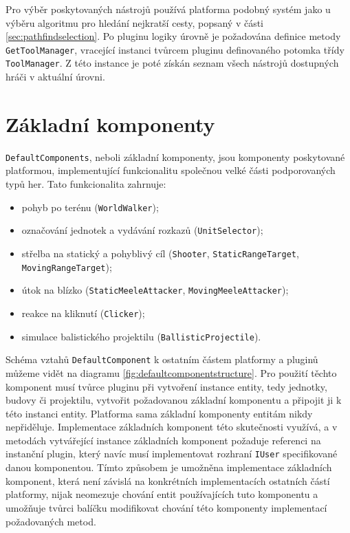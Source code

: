 Pro výběr poskytovaných nástrojů používá platforma podobný systém jako u výběru algoritmu pro hledání nejkratší cesty, popsaný v části \ref{sec:pathfindselection}. Po pluginu logiky úrovně je požadována definice metody \texttt{GetToolManager}, vracející instanci tvůrcem pluginu definovaného potomka třídy \texttt{ToolManager}. Z této instance je poté získán seznam  všech nástrojů dostupných hráči v aktuální úrovni.

\section{Základní komponenty}
\label{sec:defaultcomponents}
\texttt{DefaultComponents}, neboli základní komponenty, jsou komponenty poskytované platformou, implementující funkcionalitu společnou velké části podporovaných typů her. Tato funkcionalita zahrnuje:

\begin{itemize}
	\item pohyb po terénu (\texttt{WorldWalker});
	\item označování jednotek a vydávání rozkazů (\texttt{UnitSelector});
	\item střelba na statický a pohyblivý cíl (\texttt{Shooter}, \texttt{StaticRangeTarget}, \texttt{MovingRangeTarget});
	\item útok na blízko (\texttt{StaticMeeleAttacker}, \texttt{MovingMeeleAttacker});
	\item reakce na kliknutí (\texttt{Clicker});
	\item simulace balistického projektilu (\texttt{BallisticProjectile}).
\end{itemize}

Schéma vztahů \texttt{DefaultComponent} k ostatním částem platformy a pluginů můžeme vidět na diagramu \ref{fig:defaultcomponentstructure}. Pro použití těchto komponent musí tvůrce pluginu při vytvoření instance entity, tedy jednotky, budovy či projektilu, vytvořit požadovanou základní komponentu a připojit ji k této instanci entity. Platforma sama základní komponenty entitám nikdy nepřiděluje. Implementace základních komponent této skutečnosti využívá, a v metodách vytvářející instance základních komponent požaduje referenci na instanční plugin, který navíc musí implementovat rozhraní \texttt{IUser} specifikované danou komponentou. Tímto způsobem je umožněna implementace základních komponent, která není závislá na konkrétních implementacích ostatních částí platformy, nijak neomezuje chování entit používajících tuto komponentu a umožňuje tvůrci balíčku modifikovat chování této komponenty implementací požadovaných metod. 

